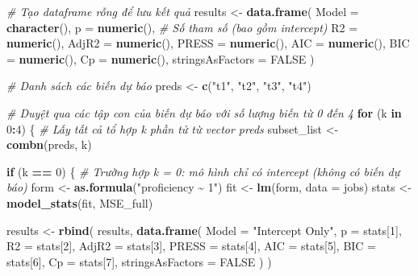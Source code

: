 \documentclass[
]{article}
\newenvironment{Shaded}{\begin{snugshade}}{\end{snugshade}}
\newcommand{\AttributeTok}[1]{\textcolor[rgb]{0.13,0.29,0.53}{#1}}
\newcommand{\CommentTok}[1]{\textcolor[rgb]{0.56,0.35,0.01}{\textit{#1}}}
\newcommand{\ConstantTok}[1]{\textcolor[rgb]{0.56,0.35,0.01}{#1}}
\newcommand{\ControlFlowTok}[1]{\textcolor[rgb]{0.13,0.29,0.53}{\textbf{#1}}}
\newcommand{\DecValTok}[1]{\textcolor[rgb]{0.00,0.00,0.81}{#1}}
\newcommand{\FunctionTok}[1]{\textcolor[rgb]{0.13,0.29,0.53}{\textbf{#1}}}
\newcommand{\NormalTok}[1]{#1}
\newcommand{\OtherTok}[1]{\textcolor[rgb]{0.56,0.35,0.01}{#1}}
\newcommand{\SpecialCharTok}[1]{\textcolor[rgb]{0.81,0.36,0.00}{\textbf{#1}}}
\newcommand{\StringTok}[1]{\textcolor[rgb]{0.31,0.60,0.02}{#1}}
\begin{document}
\begin{Shaded}
\begin{Highlighting}[]
\CommentTok{\# Tạo dataframe rỗng để lưu kết quả}
\NormalTok{results }\OtherTok{\textless{}{-}} \FunctionTok{data.frame}\NormalTok{(}
  \AttributeTok{Model   =} \FunctionTok{character}\NormalTok{(),}
  \AttributeTok{p       =} \FunctionTok{numeric}\NormalTok{(),  }\CommentTok{\# Số tham số (bao gồm intercept)}
  \AttributeTok{R2      =} \FunctionTok{numeric}\NormalTok{(),}
  \AttributeTok{AdjR2   =} \FunctionTok{numeric}\NormalTok{(),}
  \AttributeTok{PRESS   =} \FunctionTok{numeric}\NormalTok{(),}
  \AttributeTok{AIC     =} \FunctionTok{numeric}\NormalTok{(),}
  \AttributeTok{BIC     =} \FunctionTok{numeric}\NormalTok{(),}
  \AttributeTok{Cp      =} \FunctionTok{numeric}\NormalTok{(),}
  \AttributeTok{stringsAsFactors =} \ConstantTok{FALSE}
\NormalTok{)}

\CommentTok{\# Danh sách các biến dự báo}
\NormalTok{preds }\OtherTok{\textless{}{-}} \FunctionTok{c}\NormalTok{(}\StringTok{"t1"}\NormalTok{, }\StringTok{"t2"}\NormalTok{, }\StringTok{"t3"}\NormalTok{, }\StringTok{"t4"}\NormalTok{)}

\CommentTok{\# Duyệt qua các tập con của biến dự báo với số lượng biến từ 0 đến 4}
\ControlFlowTok{for}\NormalTok{ (k }\ControlFlowTok{in} \DecValTok{0}\SpecialCharTok{:}\DecValTok{4}\NormalTok{) \{}
  \CommentTok{\# Lấy tất cả tổ hợp k phần tử từ vector preds}
\NormalTok{  subset\_list }\OtherTok{\textless{}{-}} \FunctionTok{combn}\NormalTok{(preds, k)}
  
  \ControlFlowTok{if}\NormalTok{ (k }\SpecialCharTok{==} \DecValTok{0}\NormalTok{) \{}
    \CommentTok{\# Trường hợp k = 0: mô hình chỉ có intercept (không có biến dự báo)}
\NormalTok{    form }\OtherTok{\textless{}{-}} \FunctionTok{as.formula}\NormalTok{(}\StringTok{"proficiency \textasciitilde{} 1"}\NormalTok{)}
\NormalTok{    fit }\OtherTok{\textless{}{-}} \FunctionTok{lm}\NormalTok{(form, }\AttributeTok{data =}\NormalTok{ jobs)}
\NormalTok{    stats }\OtherTok{\textless{}{-}} \FunctionTok{model\_stats}\NormalTok{(fit, MSE\_full)}
    
\NormalTok{    results }\OtherTok{\textless{}{-}} \FunctionTok{rbind}\NormalTok{(}
\NormalTok{      results,}
      \FunctionTok{data.frame}\NormalTok{(}
        \AttributeTok{Model =} \StringTok{"Intercept Only"}\NormalTok{,}
        \AttributeTok{p     =}\NormalTok{ stats[}\DecValTok{1}\NormalTok{],}
        \AttributeTok{R2    =}\NormalTok{ stats[}\DecValTok{2}\NormalTok{],}
        \AttributeTok{AdjR2 =}\NormalTok{ stats[}\DecValTok{3}\NormalTok{],}
        \AttributeTok{PRESS =}\NormalTok{ stats[}\DecValTok{4}\NormalTok{],}
        \AttributeTok{AIC   =}\NormalTok{ stats[}\DecValTok{5}\NormalTok{],}
        \AttributeTok{BIC   =}\NormalTok{ stats[}\DecValTok{6}\NormalTok{],}
        \AttributeTok{Cp    =}\NormalTok{ stats[}\DecValTok{7}\NormalTok{],}
        \AttributeTok{stringsAsFactors =} \ConstantTok{FALSE}
\NormalTok{      )}
\NormalTok{    )}
    

\end{Highlighting}
\end{Shaded}
\end{document}
